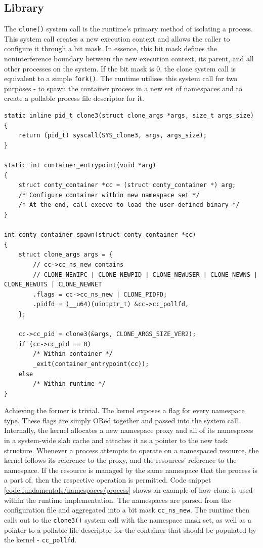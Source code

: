 \subsection{Library}
\label{ch:implementation/runtime/library}
The \verb|clone()| system call is the runtime's primary method of isolating a process.
This system call creates a new execution context and allows the caller to configure it 
through a bit mask. In essence, this bit mask defines the noninterference boundary between 
the new execution context, its parent, and all other processes on the system. If the bit mask is 0, 
the clone system call is equivalent to a simple \verb|fork()|. The runtime utilises this 
system call for two purposes - to spawn the container process in a new set of namespaces and to 
create a pollable process file descriptor for it. 
\begin{lstlisting}[style=c-code-snippets, label={code:implementation/namespaces/clone}, caption={Container instantiation within the runtime using clone3}]
static inline pid_t clone3(struct clone_args *args, size_t args_size)
{
    return (pid_t) syscall(SYS_clone3, args, args_size);
}

static int container_entrypoint(void *arg)
{
    struct conty_container *cc = (struct conty_container *) arg;
    /* Configure container within new namespace set */
    /* At the end, call execve to load the user-defined binary */
}

int conty_container_spawn(struct conty_container *cc)
{
    struct clone_args args = {
        // cc->cc_ns_new contains
        // CLONE_NEWIPC | CLONE_NEWPID | CLONE_NEWUSER | CLONE_NEWNS | CLONE_NEWUTS | CLONE_NEWNET
        .flags = cc->cc_ns_new | CLONE_PIDFD;
        .pidfd = (__u64)(uintptr_t) &cc->cc_pollfd,
    };

    cc->cc_pid = clone3(&args, CLONE_ARGS_SIZE_VER2);
    if (cc->cc_pid == 0) 
        /* Within container */
        _exit(container_entrypoint(cc));
    else 
        /* Within runtime */
}
\end{lstlisting}
    
Achieving the former is trivial. The kernel exposes a flag for every namespace type.
These flags are simply ORed together and passed into the system call. 
Internally, the kernel allocates a new namespace proxy and all of its namespaces 
in a system-wide slab cache and attaches it as a pointer to the new task structure.
Whenever a process attempts to operate on a namespaced resource, the kernel follows its reference to the 
proxy, and the resources' reference to the namespace. If the resource is managed by the same namespace 
that the process is a part of, then the respective operation is permitted.
Code snippet \ref{code:fundamentals/namespaces/process} shows an example of how clone is used 
within the runtime implementation. The namespaces are parsed from the configuration file and 
aggregated into a bit mask \verb|cc_ns_new|. The runtime then calls out to the \verb|clone3()| system call
with the namespace mask set, as well as a pointer to a pollable file descriptor for the 
container that should be populated by the kernel - \verb|cc_pollfd|. 

